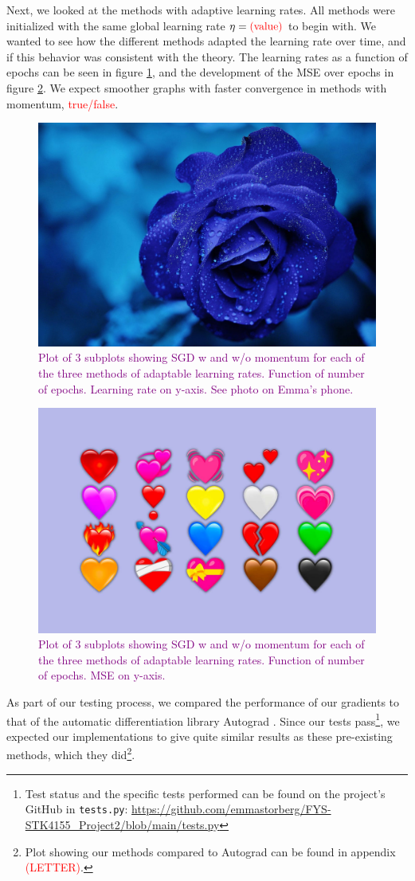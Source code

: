 Next, we looked at the methods with adaptive learning rates. All methods were initialized with the same global learning rate $\eta = \text{\textcolor{red}{(value)}}$ to begin with. We wanted to see how the different methods adapted the learning rate over time, and if this behavior was consistent with the theory. The learning rates as a function of epochs can be seen in figure \ref{fig:learningratesGD}, and the development of the MSE over epochs in figure \ref{fig:MSEGD}. We expect smoother graphs with faster convergence in methods with momentum, \textcolor{red}{true/false}.
\begin{figure}
    \centering
    \includegraphics[width=0.5\linewidth]{figures/placeholders/learningratesGD.png}
    \caption{\textcolor{purple}{Plot of 3 subplots showing SGD w and w/o momentum for each of the three methods of adaptable learning rates.  Function of number of epochs. Learning rate on y-axis. See photo on Emma's phone.}}
    \label{fig:learningratesGD}
\end{figure}

\begin{figure}
    \centering
    \includegraphics[width=0.5\linewidth]{figures/placeholders/MSEGD.png}
    \caption{\textcolor{purple}{Plot of 3 subplots showing SGD w and w/o momentum for each of the three methods of adaptable learning rates.  Function of number of epochs. MSE on y-axis.}}
    \label{fig:MSEGD}
\end{figure}

As part of our testing process, we compared the performance of our gradients to that of the automatic differentiation library Autograd \cite{autograd}. Since our tests pass\footnote{Test status and the specific tests performed can be found on the project's GitHub in \texttt{tests.py}: \url{https://github.com/emmastorberg/FYS-STK4155_Project2/blob/main/tests.py}}, we expected our implementations to give quite similar results as these pre-existing methods, which they did\footnote{Plot showing our methods compared to Autograd can be found in appendix \textcolor{red}{(LETTER)}.}. 

